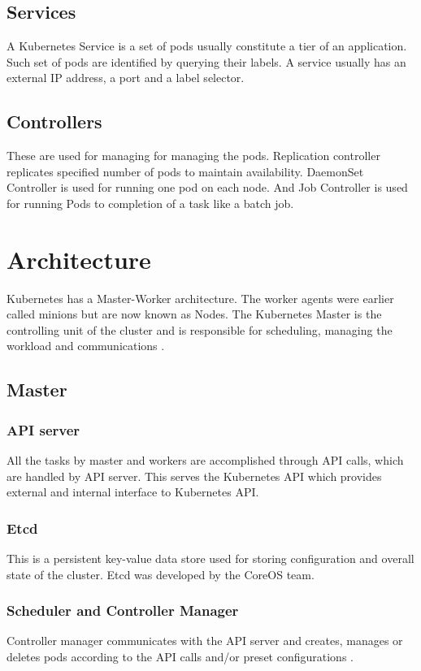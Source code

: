 \documentclass[9pt,twocolumn,twoside]{styles/osajnl}
\begin{document}
\subsection{Services}
A Kubernetes Service is a set of pods usually constitute a tier of an application. Such set of pods are identified by querying their labels. A service usually has an external IP address, a port and a label selector.

\subsection{Controllers}
 These are used for managing for managing the pods. Replication controller replicates specified number of pods to maintain availability. DaemonSet Controller is used for running one pod on each node. And Job Controller is used for running Pods to completion of a task like a batch job.

\section{Architecture}

Kubernetes has a Master-Worker architecture. The worker agents were earlier called minions but are now known as Nodes.
The Kubernetes Master is the controlling unit of the cluster and is responsible for scheduling, managing the workload and communications \cite{www-kubernetesebook}.



\subsection{Master}
\subsubsection{API server}
All the tasks by master and workers are accomplished through API calls, which are handled by API server. This serves the Kubernetes API which provides external and internal interface to Kubernetes API. 
\subsubsection{Etcd}
This is a persistent key-value data store used for storing configuration and overall state of the cluster. Etcd was developed by the CoreOS team.

\subsubsection{Scheduler and Controller Manager}
Controller manager communicates with the API server and creates, manages or deletes pods according to the API calls and/or preset configurations \cite{www-kuberneteswiki}.
\end{document}
